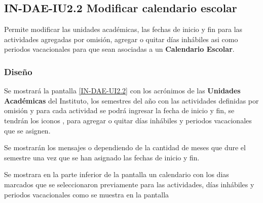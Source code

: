 \subsection{IN-DAE-IU2.2 Modificar calendario escolar}

	Permite modificar las unidades académicas, las fechas de inicio y fin para las actividades agregadas por omisión, agregar o quitar días inhábiles asi como periodos vacacionales para que sean asociadas a un \textbf{Calendario Escolar}. 

\subsubsection{Diseño}

Se mostrará la pantalla \ref{IN-DAE-UI2.2} con los acrónimos de las \textbf{Unidades Académicas} del Instituto, los semestres del año con las actividades definidas por omisión y para cada actividad se podrá ingresar la fecha de inicio y fin, se tendrán los iconos \IUAdd, \IUMenos para agregar o quitar días inhábiles y  periodos vacacionales que se asignen.

Se mostrarán los mensajes  o  dependiendo de la cantidad de meses que dure el semestre una vez que se han asignado las fechas de inicio y fin. 

Se mostrara en la parte inferior de la pantalla un calendario con los dias marcados que se seleccionaron previamente para las actividades, días inhábiles y periodos vacacionales como se muestra en la pantalla 






